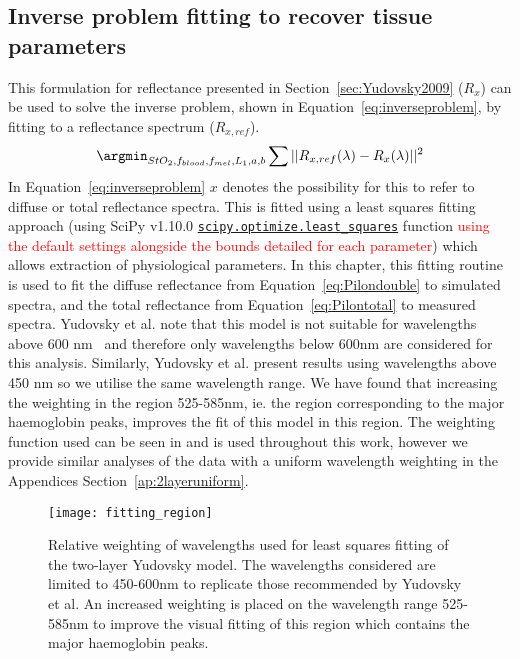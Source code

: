 \subsection{Inverse problem fitting to recover tissue parameters}\label{sec:methodinverse}
This formulation for reflectance presented in Section~\ref{sec:Yudovsky2009} ($R_x$) can be used to solve the inverse problem, shown in Equation~\eqref{eq:inverseproblem}, by fitting to a reflectance spectrum ($R_{x,ref}$). 
\begin{equation}
    \argmin_{StO_2, f_{blood}, f_{mel}, L_1, a, b} \sum || R_{x,ref}(\lambda) - R_x(\lambda) ||^2
    \label{eq:inverseproblem}
\end{equation}
In Equation~\eqref{eq:inverseproblem} $x$ denotes the possibility for this to refer to diffuse or total reflectance spectra. This is fitted using a least squares fitting approach (using SciPy v1.10.0  \newline \href{https://docs.scipy.org/doc/scipy/reference/generated/scipy.optimize.least_squares.html}{\texttt{scipy.optimize.least\_squares}} function \textcolor{red}{using the default settings alongside the bounds detailed for each parameter}) which allows extraction of physiological parameters. In this chapter, this fitting routine is used to fit the diffuse reflectance from Equation~\eqref{eq:Pilondouble} to simulated spectra, and the total reflectance from Equation~\eqref{eq:Pilontotal} to measured spectra.
Yudovsky et al. note that this model is not suitable for wavelengths above 600 nm~\citep{Yudovsky2011a} and therefore only wavelengths below 600nm are considered for this analysis. Similarly, Yudovsky et al. present results using wavelengths above 450 nm so we utilise the same wavelength range. We have found that increasing the weighting in the region 525-585nm, ie. the region corresponding to the major haemoglobin peaks, improves the fit of this model in this region. The weighting function used can be seen in  and is used throughout this work, however we provide similar analyses of the data with a uniform wavelength weighting in the Appendices Section~\ref{ap:2layeruniform}. 
\begin{figure}
    \centering
    \texttt{[image: fitting\_region]}
    \caption{Relative weighting of wavelengths used for least squares fitting of the two-layer Yudovsky model. The wavelengths considered are limited to 450-600nm to replicate those recommended by Yudovsky et al. An increased weighting is placed on the wavelength range 525-585nm to improve the visual fitting of this region which contains the major haemoglobin peaks.}
    \label{fig:weighting}
\end{figure}
